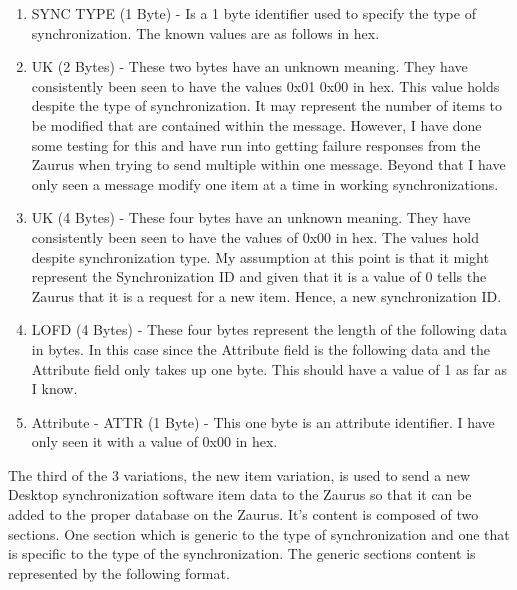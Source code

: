             \begin{enumerate}
            \item SYNC TYPE (1 Byte) - Is a 1 byte identifier used to specify
              the type of synchronization. The known values are as 
              follows in hex.

              \synctypes

            \item UK (2 Bytes) - These two bytes have an unknown meaning. They
              have consistently been seen to have the values 0x01 0x00 in
              hex. This value holds despite the type of synchronization. It
              may represent the number of items to be modified that are
              contained within the message. However, I have done some testing
              for this and have run into getting failure responses from the
              Zaurus when trying to send multiple within one message. Beyond
              that I have only seen a message modify one item at a time in
              working synchronizations.

            \item UK (4 Bytes) - These four bytes have an unknown
              meaning. They have consistently been seen to have the values of
              0x00 in hex. The values hold despite synchronization type. My
              assumption at this point is that it might represent the
              Synchronization ID and given that it is a value of 0 tells the
              Zaurus that it is a request for a new item. Hence, a new
              synchronization ID.

            \item LOFD (4 Bytes) - These four bytes represent the length of
            the following data in bytes. In this case since the Attribute
            field is the following data and the Attribute field only takes up
            one byte. This should have a value of 1 as far as I know.

            \item Attribute - ATTR (1 Byte) - This one byte is an attribute
              identifier. I have only seen it with a value of 0x00 in hex.
            \end{enumerate}

            The third of the 3 variations, the new item variation, is used to
            send a new Desktop synchronization software item data to the
            Zaurus so that it can be added to the proper database on the
            Zaurus. It's content is composed of two sections. One section
            which is generic to the type of synchronization and one that is
            specific to the type of the synchronization. The generic sections
            content is represented by the following format. 

